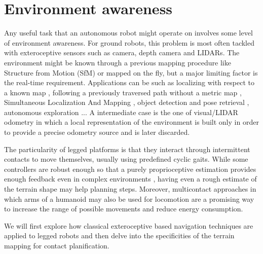 \section{Environment awareness}
Any useful task that an autonomous robot might operate on involves some level of environment awareness. For ground robots, 
this problem is most often tackled with exteroceptive sensors such as camera, depth camera and LIDARs.
The environment might be known through a previous mapping procedure like Structure from Motion (SfM) \cite{triggs1999bundle} or mapped on the fly, but a major limiting 
factor is the real-time requirement. Applications can be such as localizing with respect to a known map \cite{dellaert1999monte},
following a previously traversed path without a metric map \cite{furgale2010visual}, Simultaneous Localization And Mapping \cite{aulinas2008slam, cadena2016past}, object detection and pose retrieval \cite{du2021vision}, 
autonomous exploration \cite{rouvcek2019darpa, kulkarni2021autonomous}... A intermediate case is the one of visual/LIDAR odometry in which a local representation of the environment is built
only in order to provide a precise odometry source \cite{scaramuzza2011visual} and is later discarded. 

The particularity of legged platforms is that they interact through intermittent contacts to move themselves, usually using predefined cyclic gaits. While some controllers are 
robust enough so that a purely proprioceptive estimation provides enough feedback even in complex environments \cite{tan2018sim, lee2020learning}, having even a rough estimate of 
the terrain shape may help planning steps. Moreover, multicontact approaches \cite{carpentier2017multi, henze2017multi} in which arms of a humanoid may also be used 
for locomotion are a promising way to increase the range of possible movements and reduce energy consumption. 

We will first explore how classical exteroceptive based navigation techniques are applied to legged robots and then delve into the specificities of the 
terrain mapping for contact planification.

